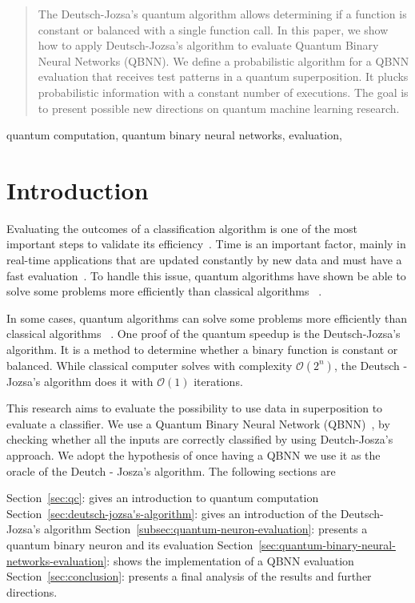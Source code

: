 \documentclass[conference]{IEEEtran}
\begin{document}
\begin{abstract}
The Deutsch-Jozsa's quantum algorithm allows determining if a function is constant or balanced with a single function call.
In this paper, we show how to apply Deutsch-Jozsa's algorithm to evaluate Quantum Binary Neural Networks (QBNN).
We define a probabilistic algorithm for a QBNN evaluation that receives test patterns in a quantum superposition.
It plucks probabilistic information with a constant number of executions.
The goal is to present possible new directions on quantum machine learning research.
\end{abstract}

\begin{IEEEkeywords}
quantum computation, quantum binary neural networks, evaluation,
\end{IEEEkeywords}

\section{Introduction}\label{sec:introduction}
Evaluating the outcomes of a classification algorithm is one of the most important steps to validate its
efficiency~\cite{japkowicz2006question}.
Time is an important factor, mainly in
real-time applications that are updated constantly by new data and must have a fast evaluation~\cite{chen2012classifier}.
To handle this issue, quantum algorithms have shown be able to solve some problems more efficiently than classical algorithms
~\cite{deutsch1992rapid}.

In some cases, quantum algorithms can solve some problems more efficiently than classical algorithms
~\cite{deutsch1992rapid}.
One proof of the quantum speedup is the Deutsch-Jozsa's algorithm.
It is a method to determine whether a binary function is constant or balanced.
While classical computer solves with complexity \(\mathcal{O}(2^{n})\),
the Deutsch - Jozsa's algorithm does it with \(\mathcal{O}(1)\) iterations.

This research aims to evaluate the possibility to use data in superposition to evaluate a classifier.
We use a Quantum Binary Neural Network (QBNN)~\cite{fawaz2019training}, by checking whether all the inputs are correctly
classified by using Deutch-Josza's approach.
We adopt the hypothesis of once having a QBNN we use it as the oracle of the Deutch - Josza's algorithm.
The following sections are

Section~\ref{sec:qc}: gives an introduction to quantum computation
Section~\ref{sec:deutsch-jozsa's-algorithm}: gives an introduction of the Deutsch-Jozsa's algorithm
Section~\ref{subsec:quantum-neuron-evaluation}: presents a quantum binary neuron and its evaluation
Section~\ref{sec:quantum-binary-neural-networks-evaluation}: shows the implementation of a QBNN evaluation
Section~\ref{sec:conclusion}: presents a final analysis of the results and further directions.
\end{document}
